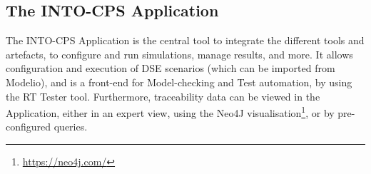 \subsection{The INTO-CPS Application}

The INTO-CPS Application is the central tool to integrate the different tools and artefacts, to configure and run simulations, manage results, and more. It allows configuration and execution of DSE scenarios (which can be imported from Modelio), and is a front-end for Model-checking and Test automation, by using the RT Tester tool. Furthermore, traceability data can be viewed in the Application, either in an expert view, using the Neo4J visualisation\footnote{\url{https://neo4j.com/}}, or by pre-configured queries.

